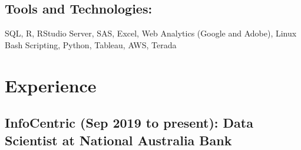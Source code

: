 \documentclass{article}
\begin{document}
\subsection{Tools and Technologies:}
SQL, R, RStudio Server, SAS, Excel, Web Analytics (Google and Adobe), Linux Bash Scripting, Python, Tableau, AWS, Terada

\section{Experience}


\subsection{InfoCentric (Sep 2019 to present): Data Scientist at National Australia Bank}
\end{document}
